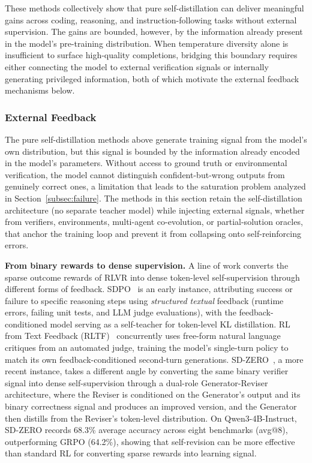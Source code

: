 \documentclass{article} %
\begin{document}
These methods collectively show that pure self-distillation can deliver meaningful gains across coding, reasoning, and instruction-following tasks without external supervision. The gains are bounded, however, by the information already present in the model's pre-training distribution. When temperature diversity alone is insufficient to surface high-quality completions, bridging this boundary requires either connecting the model to external verification signals or internally generating privileged information, both of which motivate the external feedback mechanisms below.

\subsubsection{External Feedback}
\label{subsec:external_feedback}

The pure self-distillation methods above generate training signal from the model's own distribution, but this signal is bounded by the information already encoded in the model's parameters. Without access to ground truth or environmental verification, the model cannot distinguish confident-but-wrong outputs from genuinely correct ones, a limitation that leads to the saturation problem analyzed in Section~\ref{subsec:failure}. The methods in this section retain the self-distillation architecture (no separate teacher model) while injecting external signals, whether from verifiers, environments, multi-agent co-evolution, or partial-solution oracles, that anchor the training loop and prevent it from collapsing onto self-reinforcing errors.

\textbf{From binary rewards to dense supervision.} A line of work converts the sparse outcome rewards of RLVR into dense token-level self-supervision through different forms of feedback. SDPO~\citep{2601.20802} is an early instance, attributing success or failure to specific reasoning steps using \emph{structured textual} feedback (runtime errors, failing unit tests, and LLM judge evaluations), with the feedback-conditioned model serving as a self-teacher for token-level KL distillation. RL from Text Feedback (RLTF)~\citep{2602.02482} concurrently uses free-form natural language critiques from an automated judge, training the model's single-turn policy to match its own feedback-conditioned second-turn generations. SD-ZERO~\citep{2604.12002}, a more recent instance, takes a different angle by converting the same binary verifier signal into dense self-supervision through a dual-role Generator-Reviser architecture, where the Reviser is conditioned on the Generator's output and its binary correctness signal and produces an improved version, and the Generator then distills from the Reviser's token-level distribution. On Qwen3-4B-Instruct, SD-ZERO records 68.3\% average accuracy across eight benchmarks (avg@8), outperforming GRPO (64.2\%), showing that self-revision can be more effective than standard RL for converting sparse rewards into learning signal.
\end{document}
